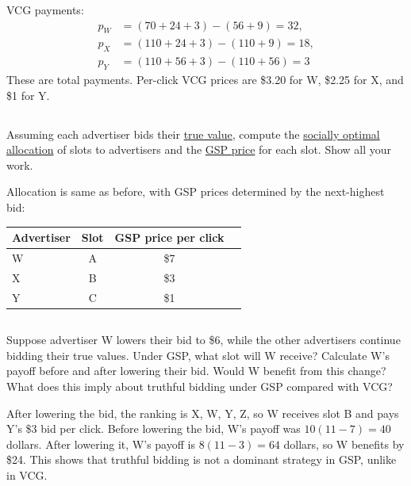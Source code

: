 \documentclass[newpages]{assignment}
\begin{document}
VCG payments:
\[
    \begin{aligned}
        p_W & =(70+24+3)-(56+9)=32,   \\
        p_X & =(110+24+3)-(110+9)=18, \\
        p_Y & =(110+56+3)-(110+56)=3
    \end{aligned}
\]
These are total payments. Per-click VCG prices are \$3.20 for W, \$2.25 for X, and \$1 for Y.

\subsection{}
\begin{problem}
    Assuming each advertiser bids their \underline{true value}, compute the \underline{socially optimal allocation} of slots to advertisers and the \underline{GSP price} for each slot. Show all your work.
\end{problem}

Allocation is same as before, with GSP prices determined by the next-highest bid:

\begin{center}
    \begin{tabular}{lccc}
        \toprule
        Advertiser & Slot & GSP price per click \\
        \midrule
        W          & A    & \$7                 \\
        X          & B    & \$3                 \\
        Y          & C    & \$1                 \\
        \bottomrule
    \end{tabular}
\end{center}

\subsection{}
\begin{problem}
    Suppose advertiser W lowers their bid to \$6, while the other advertisers continue bidding their true values. Under GSP, what slot will W receive? Calculate W's payoff before and after lowering their bid. Would W benefit from this change? What does this imply about truthful bidding under GSP compared with VCG?
\end{problem}

After lowering the bid, the ranking is X, W, Y, Z, so W receives slot B and pays Y's \$3 bid per click. Before lowering the bid, W's payoff was $10(11-7)=40$ dollars. After lowering it, W's payoff is $8(11-3)=64$ dollars, so W benefits by \$24. This shows that truthful bidding is not a dominant strategy in GSP, unlike in VCG.
\end{document}
